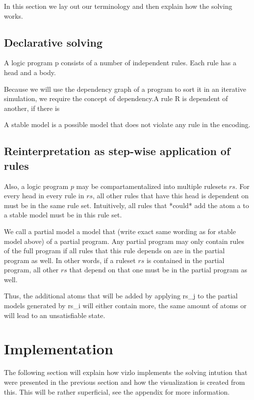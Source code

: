 In this section we lay out our terminology and then explain how the solving works. 


\subsection{Declarative solving}

A logic program p consists of a number of independent rules. Each rule has a head and a body. 

Because we will use the dependency graph of a program to sort it in an iterative simulation, we require the concept of dependency.A rule R is dependent of another, if there is %

A stable model is a possible model that does not violate any rule in the encoding.


\subsection{Reinterpretation as step-wise application of rules}

Also, a logic program $p$ may be compartamentalized into multiple rulesets $rs$. 
For every head in every rule in $rs$, all other rules that have this head is dependent on must be in the same rule set. Intuitively, all rules that *could* add the atom a to a stable model must be in this rule set. 

We call a partial model a model that (write exact same wording as for stable model above) of a partial program. Any partial program may only contain rules of the full program if all rules that this rule depends on are in the partial program as well. In other words, if a ruleset $rs$ is contained in the partial program, all other $rs$ that depend on that one must be in the partial program as well.

Thus, the additional atoms that will be added by applying rs_j to the partial models generated by rs_i will either contain more, the same amount of atoms or will lead to an unsatisfiable state. 

\section{Implementation}

The following section will explain how vizlo implements the solving intution that were presented in the previous section and how the visualization is created from this. This will be rather superficial, see the appendix for more information.
